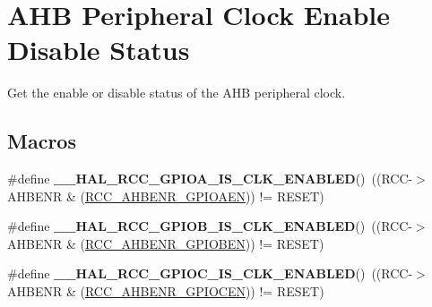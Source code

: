 \hypertarget{group___r_c_c___a_h_b___peripheral___clock___enable___disable___status}{}\section{A\+HB Peripheral Clock Enable Disable Status}
\label{group___r_c_c___a_h_b___peripheral___clock___enable___disable___status}


Get the enable or disable status of the A\+HB peripheral clock.  


\subsection*{Macros}
\begin{DoxyCompactItemize}
\item 
\mbox{\label{group___r_c_c___a_h_b___peripheral___clock___enable___disable___status_gad1edbd9407c814110f04c1a609a214e4}} 
\#define {\bfseries \+\_\+\+\_\+\+H\+A\+L\+\_\+\+R\+C\+C\+\_\+\+G\+P\+I\+O\+A\+\_\+\+I\+S\+\_\+\+C\+L\+K\+\_\+\+E\+N\+A\+B\+L\+ED}()~((R\+CC-\/$>$A\+H\+B\+E\+NR \& (\hyperlink{group___peripheral___registers___bits___definition_ga8909660b884f126ab1476daac7999619}{R\+C\+C\+\_\+\+A\+H\+B\+E\+N\+R\+\_\+\+G\+P\+I\+O\+A\+EN})) != R\+E\+S\+ET)
\item 
\mbox{\label{group___r_c_c___a_h_b___peripheral___clock___enable___disable___status_ga2fc8f9dc5f5b64c14c325c45ee301b4f}} 
\#define {\bfseries \+\_\+\+\_\+\+H\+A\+L\+\_\+\+R\+C\+C\+\_\+\+G\+P\+I\+O\+B\+\_\+\+I\+S\+\_\+\+C\+L\+K\+\_\+\+E\+N\+A\+B\+L\+ED}()~((R\+CC-\/$>$A\+H\+B\+E\+NR \& (\hyperlink{group___peripheral___registers___bits___definition_gab7995351a5b0545e8cd86a228d97dcec}{R\+C\+C\+\_\+\+A\+H\+B\+E\+N\+R\+\_\+\+G\+P\+I\+O\+B\+EN})) != R\+E\+S\+ET)
\item 
\mbox{\label{group___r_c_c___a_h_b___peripheral___clock___enable___disable___status_ga528029c120a0154dfd7cfd6159e8debe}} 
\#define {\bfseries \+\_\+\+\_\+\+H\+A\+L\+\_\+\+R\+C\+C\+\_\+\+G\+P\+I\+O\+C\+\_\+\+I\+S\+\_\+\+C\+L\+K\+\_\+\+E\+N\+A\+B\+L\+ED}()~((R\+CC-\/$>$A\+H\+B\+E\+NR \& (\hyperlink{group___peripheral___registers___bits___definition_ga7e5c4504b7adbb13372e7536123a756b}{R\+C\+C\+\_\+\+A\+H\+B\+E\+N\+R\+\_\+\+G\+P\+I\+O\+C\+EN})) != R\+E\+S\+ET)

\end{DoxyCompactItemize}
